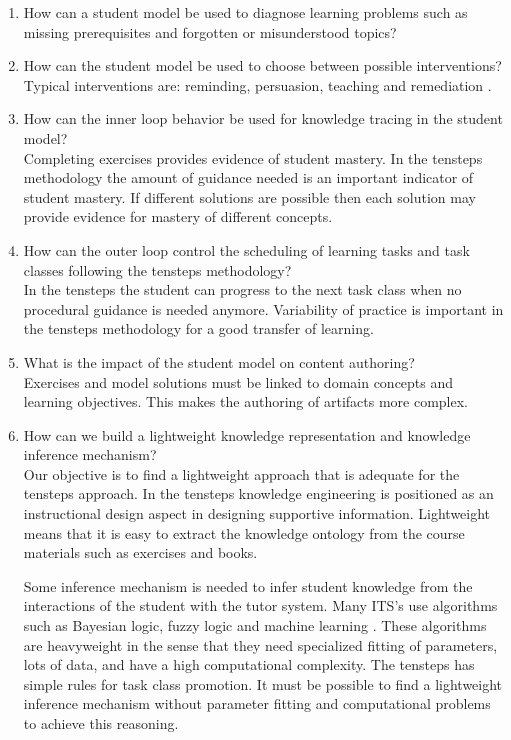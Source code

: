 \begin{enumerate}[Q1.]
\item How can a student model be used to diagnose learning problems such as missing prerequisites and forgotten or misunderstood topics?\\


\item How can the student model be used to choose between possible interventions?\\
Typical interventions are: reminding, persuasion, teaching and remediation \citep{loops}.

\item How can the inner loop behavior be used for knowledge tracing in the student model?\\
Completing exercises provides evidence of student mastery.
In the \gls{tensteps} methodology the amount of guidance needed is an important indicator of student mastery.
If different solutions are possible then each solution may provide evidence for mastery of different concepts.

\item How can the outer loop control the scheduling of learning tasks and task classes following the \gls{tensteps} methodology?\\
In the \gls{tensteps} the student can progress to the next task class when no procedural guidance is needed anymore.
Variability of practice is important in the \gls{tensteps} methodology for a good transfer of learning.

\item What is the impact of the student model on content authoring?\\
Exercises and model solutions must be linked to domain concepts and learning objectives.
This makes the authoring of artifacts more complex. 

\item How can we build a lightweight knowledge representation and knowledge inference mechanism?\\
Our objective is to find a lightweight approach that is adequate for the \gls{tensteps} approach.
In the \gls{tensteps} knowledge engineering is positioned as an instructional design aspect in designing supportive information.
Lightweight means that it is easy to extract the knowledge ontology from the course materials such as exercises and books.

Some inference mechanism is needed to infer student knowledge from the interactions of the student with the tutor system.
Many ITS's use algorithms such as Bayesian logic, fuzzy logic and machine learning \citep{chrysafiadi_2013}.
These algorithms are heavyweight in the sense that they need specialized fitting of parameters, lots of data, and have a high computational complexity.
The \gls{tensteps} has simple rules for task class promotion.
It must be possible to find a lightweight inference mechanism without parameter fitting and computational problems to achieve this reasoning.

\end{enumerate}


